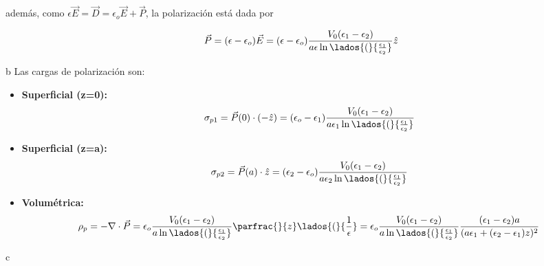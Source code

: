 \begin{solucion}{10}
además, como $\epsilon\Vec{E}= \Vec{D}=\epsilon_o\Vec{E}+\Vec{P}$, la polarización está dada por

\[\Vec{P}=(\epsilon-\epsilon_o)\Vec{E}=
(\epsilon-\epsilon_o)\frac{V_0(\epsilon_1-\epsilon_2)}{a\epsilon\ln{\lados{(}{\frac{\epsilon_1}{\epsilon_2}}}}\hat{z}\]

\ics b
Las cargas de polarización son:

\begin{itemize}
    \item \textbf{Superficial (z=0):}
    \[\sigma_{p1}=\Vec{P}(0)\cdot(-\hat{z})=(\epsilon_o-\epsilon_1)\frac{V_0(\epsilon_1-\epsilon_2)}{a\epsilon_1\ln{\lados{(}{\frac{\epsilon_1}{\epsilon_2}}}}\]
    \item \textbf{Superficial (z=a):}
    \[\sigma_{p2}=\Vec{P}(a)\cdot\hat{z}=(\epsilon_2-\epsilon_o)\frac{V_0(\epsilon_1-\epsilon_2)}{a\epsilon_2\ln{\lados{(}{\frac{\epsilon_1}{\epsilon_2}}}}\]
    \item \textbf{Volumétrica:}
    \[\rho_p=-\nabla\cdot\Vec{P}=\epsilon_o\frac{V_0(\epsilon_1-\epsilon_2)}{a\ln{\lados{(}{\frac{\epsilon_1}{\epsilon_2}}}}\parfrac{}{z}\lados{(}{\frac{1}{\epsilon}}=\epsilon_o\frac{V_0(\epsilon_1-\epsilon_2)}{a\ln{\lados{(}{\frac{\epsilon_1}{\epsilon_2}}}}\frac{(\epsilon_1-\epsilon_2)a}{(a\epsilon_1+(\epsilon_2-\epsilon_1)z)^2}\]
\end{itemize}

\ics c 





\end{solucion}
\bigbreak

